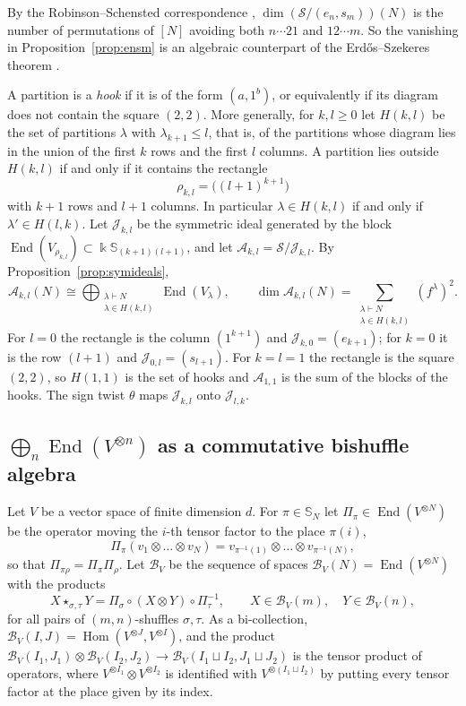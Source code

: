 \documentclass[11pt]{amsart}
\theoremstyle{definition}
\theoremstyle{remark}
\newcommand{\bS}{\mathbb{S}}
\newcommand{\kk}{\Bbbk}
\newcommand{\cA}{\mathscr{A}}
\newcommand{\cB}{\mathcal{B}}
\newcommand{\cJ}{\mathscr{J}}
\newcommand{\cS}{\mathscr{S}}
\newcommand{\End}{\operatorname{End}}
\begin{document}
By the Robinson--Schensted correspondence \cite{Schensted}, $\dim(\cS/(e_n,s_m))(N)$ is the number of permutations of $[N]$ avoiding both $n\cdots21$ and $12\cdots m$. So the vanishing in Proposition~\ref{prop:ensm} is an algebraic counterpart of the Erd\H{o}s--Szekeres theorem \cite{ES}.

A partition is a \emph{hook} if it is of the form $(a,1^b)$, or equivalently if its diagram does not contain the square $(2,2)$. More generally, for $k,l\ge0$ let $H(k,l)$ be the set of partitions $\lambda$ with $\lambda_{k+1}\le l$, that is, of the partitions whose diagram lies in the union of the first $k$ rows and the first $l$ columns. A partition lies outside $H(k,l)$ if and only if it contains the rectangle
\[
\rho_{k,l}=\bigl((l+1)^{k+1}\bigr)
\]
with $k+1$ rows and $l+1$ columns. In particular $\lambda\in H(k,l)$ if and only if $\lambda'\in H(l,k)$. Let $\cJ_{k,l}$ be the symmetric ideal generated by the block $\End(V_{\rho_{k,l}})\subset\kk\bS_{(k+1)(l+1)}$, and let $\cA_{k,l}=\cS/\cJ_{k,l}$. By Proposition~\ref{prop:symideals},
\begin{equation}\label{eq:hook-dim}
\cA_{k,l}(N)\cong\bigoplus_{\substack{\lambda\vdash N\\ \lambda\in H(k,l)}}\End(V_\lambda),\qquad
\dim\cA_{k,l}(N)=\sum_{\substack{\lambda\vdash N\\ \lambda\in H(k,l)}}(f^\lambda)^2 .
\end{equation}
For $l=0$ the rectangle is the column $(1^{k+1})$ and $\cJ_{k,0}=(e_{k+1})$; for $k=0$ it is the row $(l+1)$ and $\cJ_{0,l}=(s_{l+1})$. For $k=l=1$ the rectangle is the square $(2,2)$, so $H(1,1)$ is the set of hooks and $\cA_{1,1}$ is the sum of the blocks of the hooks. The sign twist $\theta$ maps $\cJ_{k,l}$ onto $\cJ_{l,k}$.

\subsection{\texorpdfstring{$\bigoplus_n\End(V^{\otimes n})$}{End(V^n)} as a commutative bishuffle algebra}\label{sec:End}

Let $V$ be a vector space of finite dimension $d$. For $\pi\in\bS_N$ let $\Pi_\pi\in\End(V^{\otimes N})$ be the operator moving the $i$-th tensor factor to the place $\pi(i)$,
\[
\Pi_\pi(v_1\otimes\dots\otimes v_N)=v_{\pi^{-1}(1)}\otimes\dots\otimes v_{\pi^{-1}(N)},
\]
so that $\Pi_{\pi\rho}=\Pi_\pi\Pi_\rho$. Let $\cB_V$ be the sequence of spaces $\cB_V(N)=\End(V^{\otimes N})$ with the products
\begin{equation}\label{eq:BV}
X\star_{\sigma,\tau}Y=\Pi_\sigma\circ(X\otimes Y)\circ\Pi_\tau^{-1},\qquad X\in\cB_V(m),\quad Y\in\cB_V(n),
\end{equation}
for all pairs of $(m,n)$-shuffles $\sigma,\tau$. As a bi-collection, $\cB_V(I,J)=\operatorname{Hom}(V^{\otimes J},V^{\otimes I})$, and the product $\cB_V(I_1,J_1)\otimes\cB_V(I_2,J_2)\to\cB_V(I_1\sqcup I_2,J_1\sqcup J_2)$ is the tensor product of operators, where $V^{\otimes I_1}\otimes V^{\otimes I_2}$ is identified with $V^{\otimes(I_1\sqcup I_2)}$ by putting every tensor factor at the place given by its index.
\end{document}
